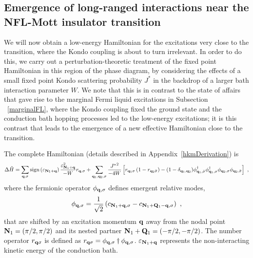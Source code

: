 \documentclass[reprint,hidelinks,onecolumn]{revtex4-2}
\begin{document}
\subsection{Emergence of long-ranged interactions near the NFL-Mott insulator transition}\label{hkmEmerge}
We will now obtain a low-energy Hamiltonian for the excitations very close to the transition, where the Kondo coupling is about to turn irrelevant. In order to do this, we carry out a perturbation-theoretic treatment of the fixed point Hamiltonian in this region of the phase diagram, by considering the effects of a small fixed point Kondo scattering probability \(J^*\) in the backdrop of a larger bath interaction parameter \(W\). We note that this is in contrast to the state of affairs that gave rise to the marginal Fermi liquid excitations in Subsection ~\ref{marginalFL}, where the Kondo coupling fixed the ground state and the conduction bath hopping processes led to the low-energy excitations; it is this contrast that leads to the emergence of a new effective Hamiltonian close to the transition. 

The complete Hamiltonian (details described in Appendix~\ref{hkmDerivation}) is
\begin{equation}\begin{aligned}
	\Delta \tilde H = \sum_{{\bf q}, \sigma}\text{sign}\left(\varepsilon_{{\bf N}_1 + {\bf q}}\right)\frac{\varepsilon_{{\bf N}_1 + {\bf q}}^2}{-W} r_{{\bf q},\sigma} + \sum_{{\bf q}_1,{\bf q}_2, \sigma}\frac{{J^*}^2}{-4W}\left[r_{{\bf q}_1 \sigma} \left(1 - r_{{\bf q}_2 \bar\sigma}\right) - (1 - \delta_{{\bf q}_1,{\bf q}_2})\phi^\dagger_{{\bf q}_1,\bar\sigma}\phi^\dagger_{{\bf q}_1,\sigma}\phi_{{\bf q}_2, \sigma}\phi_{{\bf q}_2, \bar\sigma}\right]~,
\end{aligned}\end{equation}
where the fermionic operator \(\phi_{{\bf q}, \sigma}\) defines emergent relative modes,
\begin{equation}\begin{aligned}
	\phi_{{\bf q}, \sigma} = \frac{1}{\sqrt 2}\left(c_{{\bf N}_1 + {\bf q},\sigma} - c_{{\bf N}_1 + {\bf Q}_1 - {\bf q}, \sigma}\right)~,
\end{aligned}\end{equation}
that are shifted by an excitation momentum \({\bf q}\) away from the nodal point \({\bf N}_1 = \left(\pi/2, \pi/2\right)\) and its nested partner \({\bf N}_1 + {\bf Q}_1 = \left(-\pi/2, -\pi/2\right)\). The number operator \(r_{{\bf q} \sigma}\) is defined as \(r_{{\bf q} \sigma} = \phi_{{\bf q}, \sigma}\dagger \phi_{{\bf q}, \sigma}\). \(\varepsilon_{{\bf N}_1 + {\bf q}}\) represents the non-interacting kinetic energy of the conduction bath.
\end{document}
